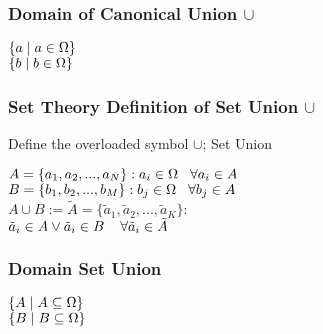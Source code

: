 \documentclass[11pt]{article}
\begin{document}
\subsubsection{Domain of Canonical Union $\cup$}
\begin{center}
$
\{ a \hspace{1mm} | \hspace{1mm} a \in \Omega\}
$
\\ \vspace{2mm}
$
\{ b \hspace{1mm}|\hspace{1mm} b \in \Omega\}
$
\end{center}





\subsubsection{Set Theory Definition of Set Union $\cup$}
Define the overloaded symbol $\cup$; Set Union
\begin{center}
\vspace{2mm}
$
A = \{a_1,a_2,...,a_N\} : a_i \in \Omega \hspace{3mm} \forall a_i \in A
$
\\ \vspace{2mm}
$
B = \{b_1,b_2,...,b_M\} : b_j \in \Omega \hspace{3mm} \forall b_j \in A
$
\\ \vspace{4mm}
$
A \cup B := \tilde{A} = \{\tilde{a}_1,\tilde{a}_2,...,\tilde{a}_K\}:
$
\\ \vspace{2mm}
$
\tilde{a}_i \in A \lor \tilde{a}_i \in B \hspace{4mm} \forall \tilde{a}_i \in \tilde{A}
$
\end{center}





\subsubsection{Domain Set Union}
\begin{center}
$
\{ A \hspace{1mm} | \hspace{1mm} A \subseteq \Omega\}
$
\\ \vspace{2mm}
$
\{ B \hspace{1mm}|\hspace{1mm} B \subseteq \Omega\}
$
\end{center}
\end{document}

